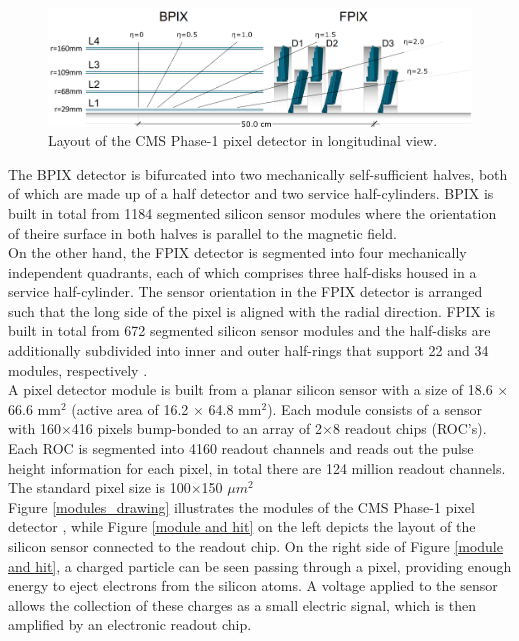 \begin{center}
  \begin{figure}[h]
    \centering
    \includegraphics[scale=.26]{Chapter2/phase1_PixelDetector.png}
    \caption[CMS Phase-1 pixel detector]{Layout of the CMS Phase-1 pixel detector in longitudinal view\cite{phase1_Pixel_Detector}.}
    \label{phase1_pixel_detector}
  \end{figure}
\end{center}

 
The BPIX detector is bifurcated into two mechanically self-sufficient halves, both of which are made up of a half detector and two service half-cylinders. BPIX is built in total from 1184 segmented silicon sensor modules where the orientation of theire surface  in both halves is parallel to the magnetic field.\\

On the other hand, the FPIX detector is segmented into four mechanically independent quadrants, each of which comprises three half-disks housed in a service half-cylinder. The sensor orientation in the FPIX detector is arranged such that the long side of the pixel is aligned with the radial direction. FPIX is built in total from 672 segmented silicon sensor modules and the half-disks are additionally subdivided into inner and outer half-rings that support 22 and 34 modules, respectively \cite{phase1_Pixel_Detector}.\\

A pixel detector module is built from a planar silicon sensor with a size of 18.6 $\times$ 66.6 $\text{mm}^{2}$ (active area of 16.2 $\times$ 64.8 $\text{mm}^{2}$). Each module consists of a sensor with 160$\times$416 pixels  bump-bonded to an array of 2$\times$8 readout chips (ROC's). Each ROC is segmented into 4160 readout channels and reads out the pulse height information for each pixel, in total there are 124 million readout channels. The standard pixel size is 100$\times$150 $\mu m^{2}$\\

Figure \ref{modules_drawing} illustrates the modules of the CMS Phase-1 pixel detector \cite{phase1_Pixel_Detector}, while Figure \ref{module and hit} on the left depicts the layout of the silicon sensor connected to the readout chip. On the right side of Figure \ref{module and hit}, a charged particle can be seen passing through a pixel, providing enough energy to eject electrons from the silicon atoms. A voltage applied to the sensor allows the collection of these charges as a small electric signal, which is then amplified by an electronic readout chip.

